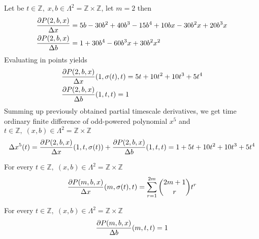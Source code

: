 \begin{examp}
    \label{time_scale_z_example_2}
    Let be $t\in\mathbb{Z}, \;x,b\in\Lambda^2 = \mathbb{Z} \times \mathbb{Z}$, let $m=2$ then
    \begin{align*}
        &\frac{\partial P ( 2, b, x )}{\Delta x}                = 5 b - 30 b^2 + 40 b^3 - 15 b^4 + 10 b x - 30 b^2 x + 20 b^3 x \\
        &\frac{\partial P ( 2, b, x )}{\Delta b}                = 1 + 30 b^4 - 60 b^3 x + 30 b^2 x^2
    \end{align*}
    Evaluating in points yields
    \begin{align*}
        &\frac{\partial P ( 2, b, x )}{\Delta x} (1, \sigma(t), t) = 5 t + 10 t^2 + 10 t^3 + 5 t^4 \\
        &\frac{\partial P ( 2, b, x )}{\Delta b} (1, t, t)         = 1
    \end{align*}
    Summing up previously obtained partial timescale derivatives, we get time ordinary finite difference of odd-powered
    polynomial $x^{5}$ and $t\in\mathbb{Z}, \; (x,b) \in\Lambda^2 = \mathbb{Z} \times \mathbb{Z}$
    \begin{align*}
        \Delta x^{5} (t)
        = \frac{\partial P ( 2, b, x )}{\Delta x} (1, t, \sigma(t))
        + \frac{\partial P ( 2, b, x )}{\Delta b} (1, t, t)
        = 1 + 5 t + 10 t^2 + 10 t^3 + 5 t^4
    \end{align*}
\end{examp}
\begin{cor}
    \label{time_scale_z_corollary_1}
    For every $t\in\mathbb{Z}, \; (x,b) \in \Lambda^2 = \mathbb{Z} \times \mathbb{Z}$
    \begin{align*}
        \frac{\partial P ( m, b, x )}{\Delta x} (m, \sigma(t), t)
        = \sum_{r=1}^{2m} \binom{2m+1}{r} t^{r}
    \end{align*}
\end{cor}
\begin{cor}
    \label{time_scale_z_corollary_2}
    For every $t\in\mathbb{Z}, \; (x,b) \in \Lambda^2 = \mathbb{Z} \times \mathbb{Z}$
    \begin{align*}
        \frac{\partial P ( m, b, x )}{\Delta b} (m, t, t) = 1
    \end{align*}
\end{cor}

